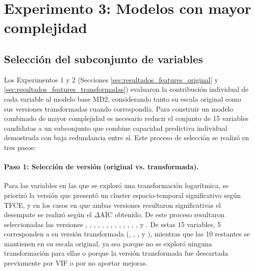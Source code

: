 \section{Experimento 3: Modelos con mayor complejidad}
\label{sec:combinacion_variables}

\subsection{Selección del subconjunto de variables}

Los Experimentos 1 y 2 (Secciones \ref{sec:resultados_features_original} y \ref{sec:resultados_features_transformadas}) evaluaron
la contribución individual de cada variable al modelo base MD2, considerando tanto su escala
original como sus versiones transformadas cuando correspondía. Para construir un modelo
combinado de mayor complejidad es necesario reducir el conjunto de 15
variables candidatas a un subconjunto que combine capacidad predictiva individual demostrada
con baja redundancia entre sí. Este proceso de selección se realizó en tres pasos:

\paragraph{Paso 1: Selección de versión (original vs. transformada).}
\begin{sloppypar}
Para las variables en las que se exploró una transformación logarítmica, se priorizó la
versión que presentó un cluster espacio-temporal significativo según TFCE, y en los casos
en que ambas versiones resultaron significativas el desempate se realizó según el
$\Delta$AIC obtenido. De este proceso resultaron seleccionadas las versiones
, ,
, ,
, ,
, ,
, , ,
, ,
 y . De estas 15 variables,
5 corresponden a su versión transformada (,
, ,
 y ), mientras que las
10 restantes se mantienen en su escala original, ya sea porque no se exploró
ninguna transformación para ellas o porque la versión transformada fue
descartada previamente por VIF o por no aportar mejoras.
\end{sloppypar}

